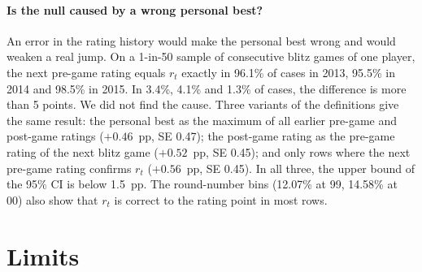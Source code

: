 \documentclass[11pt]{article}
\begin{document}
\paragraph{Is the null caused by a wrong personal best?} An error in the rating history would make the personal best wrong and would weaken a real jump. On a 1-in-50 sample of consecutive blitz games of one player, the next pre-game rating equals $r_t$ exactly in 96.1\% of cases in 2013, 95.5\% in 2014 and 98.5\% in 2015. In 3.4\%, 4.1\% and 1.3\% of cases, the difference is more than 5 points. We did not find the cause. Three variants of the definitions give the same result: the personal best as the maximum of all earlier pre-game and post-game ratings ($+0.46$~pp, SE 0.47); the post-game rating as the pre-game rating of the next blitz game ($+0.52$~pp, SE 0.45); and only rows where the next pre-game rating confirms $r_t$ ($+0.56$~pp, SE 0.45). In all three, the upper bound of the 95\% CI is below 1.5~pp. The round-number bins (12.07\% at 99, 14.58\% at 00) also show that $r_t$ is correct to the rating point in most rows.

\section{Limits}\label{sec:limits}
\end{document}
